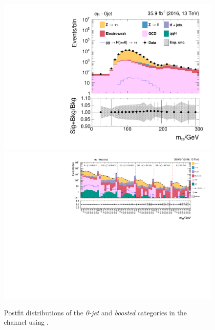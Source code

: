 \begin{figure}[h!]
    \centering
        \includegraphics[width=.5\textwidth]{Figures/statana/Postfit_JEC_jdphi/postfit_fit_s_htt_em_1_13TeV.pdf}\\
        \includegraphics[width=\textwidth]{Figures/statana/Postfit_JEC_jdphi/postfit_fit_s_htt_em_2_13TeV.pdf}
    \caption{Postfit distributions of the \textit{0-jet} and \textit{boosted} categories in the \emu{} channel  using \jdphi{}.}
\end{figure}
